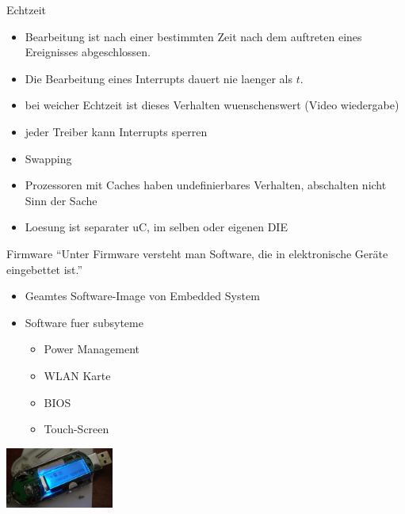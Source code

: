 



\begin{frame}{Echtzeit}
	\begin{itemize}
		\item Bearbeitung ist nach einer bestimmten Zeit nach dem auftreten eines Ereignisses abgeschlossen.
		\item Die Bearbeitung eines Interrupts dauert nie laenger als $t$.
		\item bei weicher Echtzeit ist dieses Verhalten wuenschenswert (Video wiedergabe)
		\item jeder Treiber kann Interrupts sperren
		\item Swapping
		\item Prozessoren mit Caches haben undefinierbares Verhalten, abschalten nicht Sinn der Sache
		\item Loesung ist separater uC, im selben oder eigenen DIE
	\end{itemize}
\end{frame}

\begin{frame}{Firmware}
	``Unter Firmware versteht man Software, die in elektronische Geräte eingebettet ist.'' \cite{wikiFirmware}
	
	\begin{itemize}
		\item Geamtes Software-Image von Embedded System
		\item Software fuer subsyteme
		\begin{itemize}
			\item Power Management
			\item WLAN Karte
			\item BIOS
			\item Touch-Screen
		\end{itemize}
	\end{itemize}
	
	\includegraphics[height=2cm]{res/Firmware_upgrade.jpg} \cite{firmwareUpgrade}
\end{frame}

